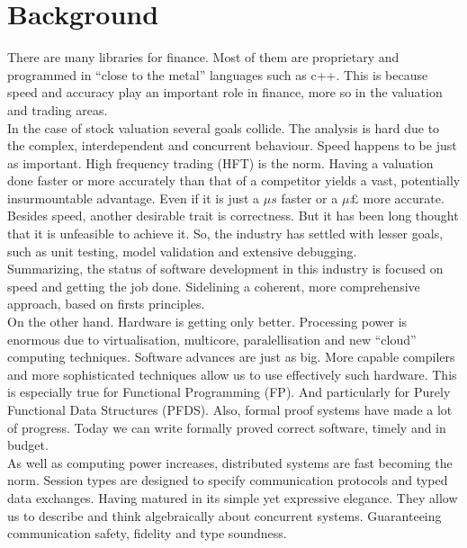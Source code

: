 \documentclass{tufte-book} %
\begin{document}
\chapter{Background} %

There are many libraries for finance. Most of them are proprietary and programmed in ``close to the metal'' languages such as c++. This is because speed and accuracy play an important role in finance, more so in the valuation and trading areas.\\

In the case of stock valuation several goals collide. The analysis is hard due to the complex, interdependent and  concurrent behaviour.  Speed happens to be just as important. High frequency trading (HFT) is the norm. Having a valuation done faster or more accurately than that of a competitor yields a vast, potentially insurmountable advantage. Even if it is just a $\mu s$ faster or a $\mu \pounds$ more accurate.\\

Besides speed, another desirable trait is correctness. But it has been long thought that it is unfeasible to achieve it. So, the industry has settled with lesser goals, such as unit testing, model validation and extensive debugging.\\

Summarizing, the status of software development in this industry is focused on speed and getting the job done. Sidelining a coherent, more comprehensive approach, based on firsts principles.\\

On the other hand. Hardware is getting only better.  Processing power is enormous due to virtualisation, multicore, paralellisation and new ``cloud'' computing techniques. Software advances are just as big. More capable compilers and more sophisticated techniques allow us to use effectively such hardware. This is especially true for Functional Programming (FP). And particularly for Purely Functional Data Structures (PFDS).  Also, formal proof systems have made a lot of progress.  Today we can write formally proved correct software, timely and in budget.\\

As well as computing power increases, distributed systems are fast becoming the norm. Session types are designed to specify communication protocols and typed data exchanges. Having matured in its simple yet expressive elegance. They allow us to describe and think algebraically about concurrent systems. Guaranteeing communication safety, fidelity and type soundness.\\
\end{document}
